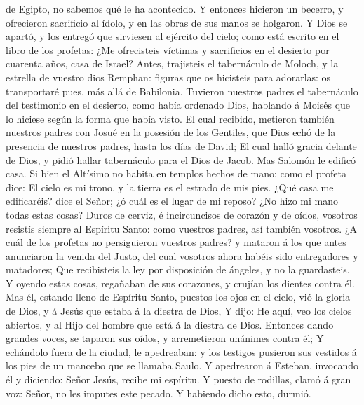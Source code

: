 de Egipto, no sabemos qué le ha acontecido.  Y entonces
hicieron un becerro, y ofrecieron sacrificio al ídolo, y en las obras de
sus manos se holgaron.  Y Dios se apartó, y los entregó que
sirviesen al ejército del cielo; como está escrito en el libro de los
profetas: ¿Me ofrecisteis víctimas y sacrificios en el desierto por
cuarenta años, casa de Israel?  Antes, trajisteis el
tabernáculo de Moloch, y la estrella de vuestro dios Remphan: figuras
que os hicisteis para adorarlas: os transportaré pues, más allá de
Babilonia.  Tuvieron nuestros padres el tabernáculo del
testimonio en el desierto, como había ordenado Dios, hablando á Moisés
que lo hiciese según la forma que había visto.  El cual
recibido, metieron también nuestros padres con Josué en la posesión de
los Gentiles, que Dios echó de la presencia de nuestros padres, hasta
los días de David;  El cual halló gracia delante de Dios, y
pidió hallar tabernáculo para el Dios de Jacob.  Mas
Salomón le edificó casa.  Si bien el Altísimo no habita en
templos hechos de mano; como el profeta dice:  El cielo es
mi trono, y la tierra es el estrado de mis pies. ¿Qué casa me
edificaréis? dice el Señor; ¿ó cuál es el lugar de mi reposo?
 ¿No hizo mi mano todas estas cosas?  Duros de
cerviz, é incircuncisos de corazón y de oídos, vosotros resistís siempre
al Espíritu Santo: como vuestros padres, así también vosotros.
 ¿A cuál de los profetas no persiguieron vuestros padres? y
mataron á los que antes anunciaron la venida del Justo, del cual
vosotros ahora habéis sido entregadores y matadores;  Que
recibisteis la ley por disposición de ángeles, y no la guardasteis.
 Y oyendo estas cosas, regañaban de sus corazones, y
crujían los dientes contra él.  Mas él, estando lleno de
Espíritu Santo, puestos los ojos en el cielo, vió la gloria de Dios, y á
Jesús que estaba á la diestra de Dios,  Y dijo: He aquí,
veo los cielos abiertos, y al Hijo del hombre que está á la diestra de
Dios.  Entonces dando grandes voces, se taparon sus oídos,
y arremetieron unánimes contra él;  Y echándolo fuera de la
ciudad, le apedreaban: y los testigos pusieron sus vestidos á los pies
de un mancebo que se llamaba Saulo.  Y apedrearon á
Esteban, invocando él y diciendo: Señor Jesús, recibe mi espíritu.
 Y puesto de rodillas, clamó á gran voz: Señor, no les
imputes este pecado. Y habiendo dicho esto, durmió.

